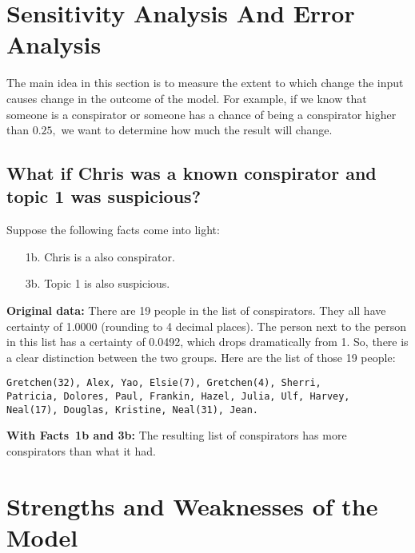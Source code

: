 \documentclass{icmmcm}
\begin{document}

\section{Sensitivity Analysis And Error Analysis}
The main idea in this section is to measure the extent to which change the input causes change in the outcome of the model. 
For example, if we know that someone is a conspirator
or someone has a chance of being a conspirator 
higher than $0.25,$
we want to determine how much the result will change.

\subsection{What if Chris was a known conspirator and topic 1 was suspicious?}

Suppose the following facts come into light:
\begin{enumerate}
\item[1b.] Chris is a also conspirator.
\item[3b.] Topic 1 is also suspicious.
\end{enumerate}

\textbf{Original data:}
There are 19 people in the list of conspirators.
They all have certainty of 1.0000 (rounding to 4 decimal places). The person next to the person in this list has
a certainty of 0.0492, which drops dramatically from 1.
So, there is a clear distinction between the two groups.
Here are the list of those 19 people:
\begin{verbatim}
Gretchen(32), Alex, Yao, Elsie(7), Gretchen(4), Sherri,
Patricia, Dolores, Paul, Frankin, Hazel, Julia, Ulf, Harvey,
Neal(17), Douglas, Kristine, Neal(31), Jean.
\end{verbatim}

\textbf{With Facts~1b and 3b:}
The resulting list of conspirators has more conspirators than what it had.
\section{Strengths and Weaknesses of the Model}
\end{document}
